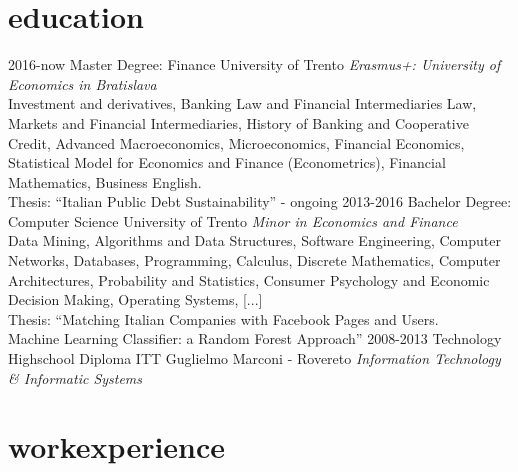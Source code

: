 \documentclass[]{friggeri-cv}
\begin{document}
\section{education}

\begin{entrylist}

\entry
    {2016-now}
    {Master Degree: Finance}
    {University of Trento}
    {\emph{Erasmus+: University of Economics in Bratislava}\\
    Investment and derivatives, Banking Law and Financial Intermediaries Law, Markets and Financial Intermediaries, History of Banking and Cooperative Credit, Advanced Macroeconomics, Microeconomics, Financial Economics, Statistical Model for Economics and Finance (Econometrics), Financial Mathematics, Business English.\\
    Thesis: “Italian Public Debt Sustainability” - ongoing
    }
\entry
    {2013-2016}
    {Bachelor Degree: Computer Science}
    {University of Trento}
    {\emph{Minor in Economics and Finance}\\
    Data Mining, Algorithms and Data Structures, Software Engineering, Computer Networks, Databases, Programming, Calculus, Discrete Mathematics, Computer Architectures, Probability and Statistics, Consumer Psychology and Economic Decision Making, Operating Systems, [...]\\
    Thesis: “Matching Italian Companies with Facebook Pages and Users.\\Machine Learning Classifier: a Random Forest Approach”
    }
\entry
    {2008-2013}
    {Technology Highschool Diploma}
    {ITT Guglielmo Marconi - Rovereto}
    {\emph{Information Technology \& Informatic Systems}}

\end{entrylist}

\section{workexperience}
\end{document}
